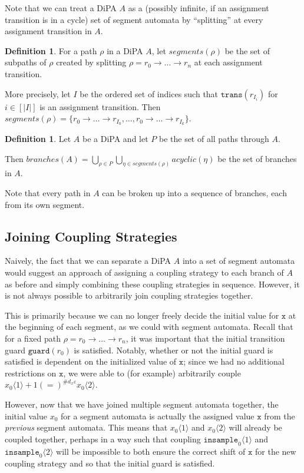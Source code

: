 \documentclass[12pt]{article}
\newcommand{\brangle}[1]{\langle #1 \rangle}
\newcommand{\guard}{\texttt{guard}}
\newcommand{\trans}{\texttt{trans}}
\theoremstyle{definition}
\newtheorem{defn}[thm]{Definition}
\begin{document}
Note that we can treat a DiPA $A$ as a (possibly infinite, if an assignment transition is in a cycle) set of segment automata by ``splitting'' at every assignment transition in $A$. 


\begin{defn}
    For a path $\rho$ in a DiPA $A$, let $segments(\rho)$ be the set of subpaths of $\rho$ created by splitting $\rho=r_0\to\ldots\to r_n$ at each assignment transition. 
    
    More precisely, let $I$ be the ordered set of indices such that $\trans(r_{I_i})$ for $i\in [|I|]$ is an assignment transition. Then $segments(\rho) = \{r_0\to\ldots\to r_{I_0}, \ldots, r_0\to\ldots\to r_{I_k}\}$.
\end{defn}

\begin{defn}
    Let $A$ be a DiPA and let $P$ be the set of all paths through $A$. 
    
    Then $branches(A) = \bigcup_{\rho\in P}\bigcup_{\eta\in segments(\rho)} acyclic(\eta)$ be the set of branches in $A$.
\end{defn}

Note that every path in $A$ can be broken up into a sequence of branches, each from its own segment. 

\subsection{Joining Coupling Strategies}

Naively, the fact that we can separate a DiPA $A$ into a set of segment automata would suggest an approach of assigning a coupling strategy to each branch of $A$ as before and simply combining these coupling strategies in sequence. However, it is not always possible to arbitrarily join coupling strategies together. 

This is primarily because we can no longer freely decide the initial value for $\texttt{x}$ at the beginning of each segment, as we could with segment automata. Recall that for a fixed path $\rho = r_0\to\ldots\to r_n$, it was important that the initial transition guard $\guard(r_0)$ is satisfied. 
Notably, whether or not the initial guard is satisfied is dependent on the initialized value of $\texttt{x}$; since we had no additional restrictions on $\texttt{x}$, we were able to (for example) arbitrarily couple $x_0\brangle{1}+1(=)^{\#d_x\varepsilon}x_0\brangle{2}$.

However, now that we have joined multiple segment automata together, the initial value $x_0$ for a segment automata is actually the assigned value $\texttt{x}$ from the \textit{previous} segment automata. 
This means that $x_0\brangle{1}$ and $x_0\brangle{2}$ will already be coupled together, perhaps in a way such that coupling $\texttt{insample}_0\brangle{1}$ and $\texttt{insample}_0\brangle{2}$ will be impossible to both ensure the correct shift of $\texttt{x}$ for the new coupling strategy and so that the initial guard is satisfied.
\end{document}
